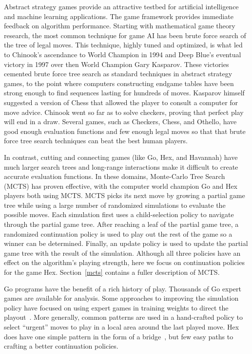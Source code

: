 \documentclass{acm_proc_article-sp}
\begin{document}
Abstract strategy games provide an attractive testbed for artificial intelligence and machine learning applications. The game framework provides immediate feedback on algorithm performance. 
Starting with mathematical game theory research, the most common technique for game AI has been brute force search of the tree of legal moves. 
This technique, highly tuned and optimized, is what led to Chinook's ascendance to World Champion in 1994 and Deep Blue's eventual victory in 1997 over then World Champion Gary Kasparov. These victories cemented brute force tree search as standard techniques in abstract strategy games, to the point where computers constructing endgame tables have been strong enough to find sequences lasting for hundreds of moves. Kasparov himself suggested a version of Chess that allowed the player to consult a computer for move advice. Chinook went so far as to solve checkers, proving that perfect play will end in a draw. 
Several games, such as  Checkers, Chess, and Othello, have good enough evaluation functions and few enough legal moves so that that brute force tree search techniques can beat the best human players.

In contrast, cutting and connecting games (like Go, Hex, and Havannah)
have much larger search trees and long-range interactions make it difficult to create accurate evaluation functions.
In these domains, Monte-Carlo Tree Search (MCTS) has proven effective, 
with the computer world champion Go and Hex players both using MCTS.
MCTS picks its next move by growing a partial game tree while using
a large number of randomized simulations to evaluate the possible moves.
Each simulation first uses a child-selection policy to navigate through the partial game tree.
After reaching a leaf of the partial game tree, a randomized continuation policy is used to play out the rest of the game 
so a winner can be determined.
Finally, an update policy is used to update the partial game tree with the result of the simulation.
Although all three policies have an effect on the algorithm's playing strength, here we focus on
continuation policies for the game Hex.
Section~\ref{mcts} contains a fuller description of MCTS.

Go programs have the benefit of a rich history of play. Thousands of Go expert games are available for analysis. Some approaches to improving the simulation policy have focused on using expert games in training weights to direct the playout~\cite{chaslot2010adding}. More generally, common patterns are used in a hand-crafted policy to select ``urgent'' moves to play in a local area around the last played move. Hex does have one simple pattern in the form of a bridge~\cite{anshelevich2002hierarchical}, but few easy paths to crafting a better continuation policies.
\end{document}
